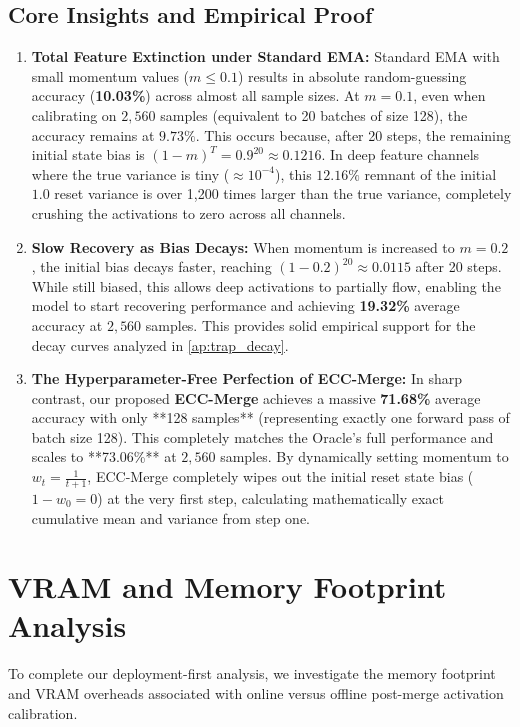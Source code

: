 \documentclass{article}
\theoremstyle{plain}
\theoremstyle{definition}
\theoremstyle{remark}
\begin{document}
\subsection{Core Insights and Empirical Proof}
\begin{enumerate}
    \item \textbf{Total Feature Extinction under Standard EMA:} Standard EMA with small momentum values ($m \le 0.1$) results in absolute random-guessing accuracy (\textbf{10.03\%}) across almost all sample sizes. At $m=0.1$, even when calibrating on $2,560$ samples (equivalent to 20 batches of size 128), the accuracy remains at $9.73\%$. This occurs because, after 20 steps, the remaining initial state bias is $(1 - m)^T = 0.9^{20} \approx 0.1216$. In deep feature channels where the true variance is tiny ($\approx 10^{-4}$), this $12.16\%$ remnant of the initial $1.0$ reset variance is over 1,200 times larger than the true variance, completely crushing the activations to zero across all channels.
    \item \textbf{Slow Recovery as Bias Decays:} When momentum is increased to $m=0.2$, the initial bias decays faster, reaching $(1 - 0.2)^{20} \approx 0.0115$ after 20 steps. While still biased, this allows deep activations to partially flow, enabling the model to start recovering performance and achieving \textbf{19.32\%} average accuracy at $2,560$ samples. This provides solid empirical support for the decay curves analyzed in \cref{ap:trap_decay}.
    \item \textbf{The Hyperparameter-Free Perfection of ECC-Merge:} In sharp contrast, our proposed \textbf{ECC-Merge} achieves a massive \textbf{71.68\%} average accuracy with only **128 samples** (representing exactly one forward pass of batch size 128). This completely matches the Oracle's full performance and scales to **73.06\%** at $2,560$ samples. By dynamically setting momentum to $w_t = \frac{1}{t+1}$, ECC-Merge completely wipes out the initial reset state bias ($1 - w_0 = 0$) at the very first step, calculating mathematically exact cumulative mean and variance from step one.
\end{enumerate}

\section{VRAM and Memory Footprint Analysis}
\label{ap:memory_analysis}
To complete our deployment-first analysis, we investigate the memory footprint and VRAM overheads associated with online versus offline post-merge activation calibration. 
\end{document}
